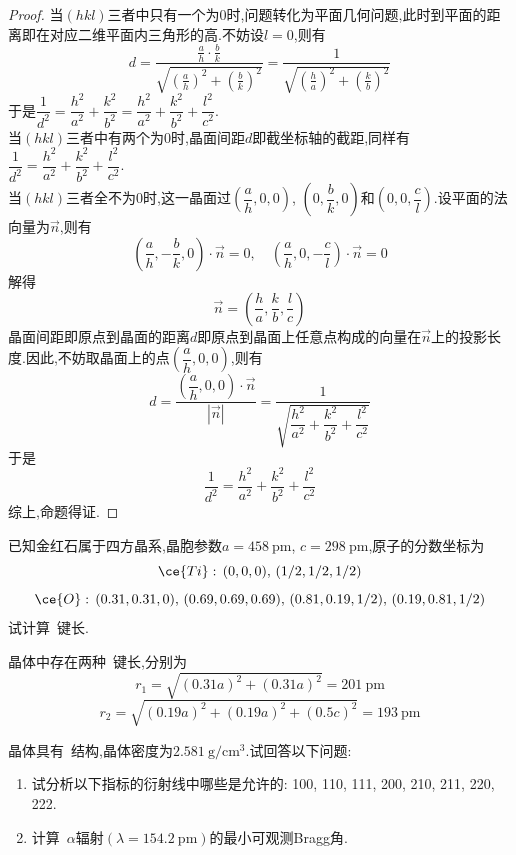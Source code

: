 \documentclass{ctexart}
\begin{document}
\begin{proof}
    当$(hkl)$三者中只有一个为$0$时,问题转化为平面几何问题,此时到平面的距离即在对应二维平面内三角形的高.不妨设$l=0$,则有
    \[d=\dfrac{\frac{a}{h}\cdot\frac{b}{k}}{\sqrt{\left(\frac{a}{h}\right)^2+\left(\frac{b}{k}\right)^2}}=\dfrac{1}{\sqrt{\left(\frac{h}{a}\right)^2+\left(\frac{k}{b}\right)^2}}\]
    于是$\dfrac{1}{d^2}=\dfrac{h^2}{a^2}+\dfrac{k^2}{b^2}=\dfrac{h^2}{a^2}+\dfrac{k^2}{b^2}+\dfrac{l^2}{c^2}$.\\
    当$(hkl)$三者中有两个为$0$时,晶面间距$d$即截坐标轴的截距,同样有$\dfrac{1}{d^2}=\dfrac{h^2}{a^2}+\dfrac{k^2}{b^2}+\dfrac{l^2}{c^2}$.\\
    当$(hkl)$三者全不为$0$时,这一晶面过$\left(\dfrac{a}{h},0,0\right)$, $\left(0,\dfrac{b}{k},0\right)$和$\left(0,0,\dfrac{c}{l}\right)$.设平面的法向量为$\vec{n}$,则有
    \[\left(\dfrac{a}{h},-\dfrac{b}{k},0\right)\cdot\vec{n}=0,\quad\left(\dfrac{a}{h},0,-\dfrac{c}{l}\right)\cdot\vec{n}=0\]
    解得
    \[\vec{n}=\left(\dfrac{h}{a},\dfrac{k}{b},\dfrac{l}{c}\right)\]
    晶面间距即原点到晶面的距离$d$即原点到晶面上任意点构成的向量在$\vec{n}$上的投影长度.因此,不妨取晶面上的点$\left(\dfrac{a}{h},0,0\right)$,则有
    \[d=\dfrac{\left(\dfrac{a}{h},0,0\right)\cdot\vec{n}}{|\vec{n}|}=\dfrac{1}{\sqrt{\dfrac{h^2}{a^2}+\dfrac{k^2}{b^2}+\dfrac{l^2}{c^2}}}\]
    于是
    \[\dfrac{1}{d^2}=\dfrac{h^2}{a^2}+\dfrac{k^2}{b^2}+\dfrac{l^2}{c^2}\]
    综上,命题得证.
\end{proof}
\begin{homework}[11.]
    已知金红石属于四方晶系,晶胞参数$a=\SI{458}{\pico\meter}$, $c=\SI{298}{\pico\meter}$,原子的分数坐标为
    \[\ce{Ti}:\,(0,0,0),\,(1/2,1/2,1/2)\]
    \[\ce{O}:\,(0.31,0.31,0),\,(0.69,0.69,0.69),\,(0.81,0.19,1/2),\,(0.19,0.81,1/2)\]
    试计算~键长.
\end{homework}
\begin{solution}
    晶体中存在两种~键长,分别为
    \[r_1=\sqrt{(0.31a)^2+(0.31a)^2}=\SI{201}{\pico\meter}\]
    \[r_2=\sqrt{(0.19a)^2+(0.19a)^2+(0.5c)^2}=\SI{193}{\pico\meter}\]
\end{solution}
\begin{homework}[12.]
    晶体具有~结构,晶体密度为$\SI{2.581}{\gram\per\centi\meter^3}$.试回答以下问题:
    \begin{enumerate}[label=\tbf{(\alph*)}]
        \item 试分析以下指标的衍射线中哪些是允许的: 100, 110, 111, 200, 210, 211, 220, 222.
        \item 计算~$\alpha$辐射$(\lambda=\SI{154.2}{\pico\meter})$的最小可观测Bragg角.
    \end{enumerate}
\end{homework}
\end{document}
